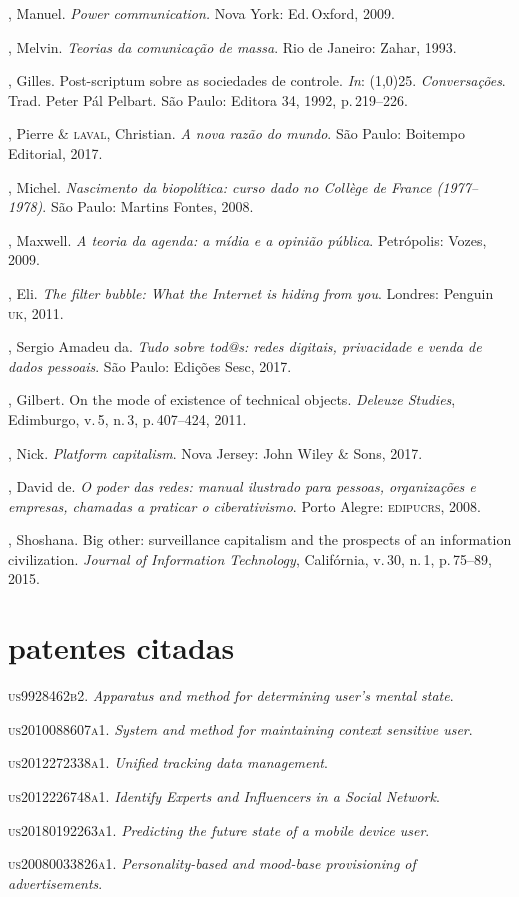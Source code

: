\begin{bibliohedra}
, Manuel. \textit{Power communication.} Nova York: Ed.\,Oxford,
2009.

, Melvin. \textit{Teorias da comunicação de massa}. Rio de Janeiro: Zahar, 1993.

, Gilles. Post-scriptum sobre as sociedades de controle. \textit{In}:
\line(1,0){25}. \textit{Conversações}. Trad. Peter Pál Pelbart. São Paulo:
Editora 34, 1992, p.\,219--226.

, Pierre \& \textsc{laval}, Christian. \textit{A nova razão do mundo}.
São Paulo: Boitempo Editorial, 2017.

, Michel. \textit{Nascimento da biopolítica: curso dado no
Collège de France (1977--1978)}. São Paulo: Martins Fontes, 2008.

, Maxwell. \textit{A teoria da agenda: a mídia e a opinião
pública}. Petrópolis: Vozes, 2009.

, Eli. \textit{The filter bubble: What the Internet is hiding
from you}. Londres: Penguin \textsc{uk}, 2011.

, Sergio Amadeu da. \textit{Tudo sobre tod@s: redes digitais,
privacidade e venda de dados pessoais}. São Paulo: Edições Sesc, 2017.

, Gilbert. On the mode of existence of technical
objects. \textit{Deleuze Studies}, Edimburgo, v.\,5, n.\,3, p.\,407--424, 2011.

, Nick. \textit{Platform capitalism}. Nova Jersey: John Wiley \& Sons, 2017.

, David de. \textit{O poder das redes: manual ilustrado para
pessoas, organizações e empresas, chamadas a praticar o ciberativismo}.
Porto Alegre: \textsc{edipucrs}, 2008.

, Shoshana. Big other: surveillance capitalism and the
prospects of an information civilization. \textit{Journal of Information
Technology}, Califórnia, v.\,30, n.\,1, p.\,75--89, 2015.

\section{patentes citadas}
\tit\textsc{us9928462b2}. \textit{Apparatus and method for determining user's mental state}.

\tit\textsc{us2010088607a1}. \textit{System and method for maintaining context sensitive user}.

\tit\textsc{us2012272338a1}. \textit{Unified tracking data management}.

\tit\textsc{us2012226748a1}. \textit{Identify Experts and Influencers in a Social Network}.

\tit\textsc{us20180192263a1}. \textit{Predicting the future state of a mobile device user}.

\tit\textsc{us20080033826a1}. \textit{Personality-based and mood-base provisioning of advertisements}.
\end{bibliohedra}

